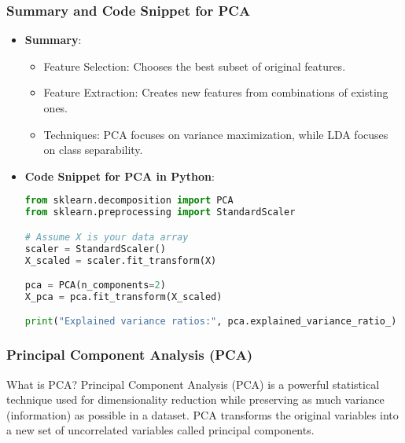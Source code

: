 \documentclass[aspectratio=169]{beamer}
\begin{document}
\begin{frame}[fragile]
    \frametitle{Summary and Code Snippet for PCA}
    \begin{itemize}
        \item \textbf{Summary}:
            \begin{itemize}
                \item Feature Selection: Chooses the best subset of original features.
                \item Feature Extraction: Creates new features from combinations of existing ones.
                \item Techniques: PCA focuses on variance maximization, while LDA focuses on class separability.
            \end{itemize}
        \item \textbf{Code Snippet for PCA in Python}:
        \begin{lstlisting}[language=Python]
from sklearn.decomposition import PCA
from sklearn.preprocessing import StandardScaler

# Assume X is your data array
scaler = StandardScaler()
X_scaled = scaler.fit_transform(X)

pca = PCA(n_components=2)
X_pca = pca.fit_transform(X_scaled)

print("Explained variance ratios:", pca.explained_variance_ratio_)
        \end{lstlisting}
    \end{itemize}
\end{frame}

\begin{frame}[fragile]
  \frametitle{Principal Component Analysis (PCA)}
  \begin{block}{What is PCA?}
    Principal Component Analysis (PCA) is a powerful statistical technique used for dimensionality reduction while preserving as much variance (information) as possible in a dataset. PCA transforms the original variables into a new set of uncorrelated variables called principal components.
  \end{block}
\end{frame}
\end{document}
